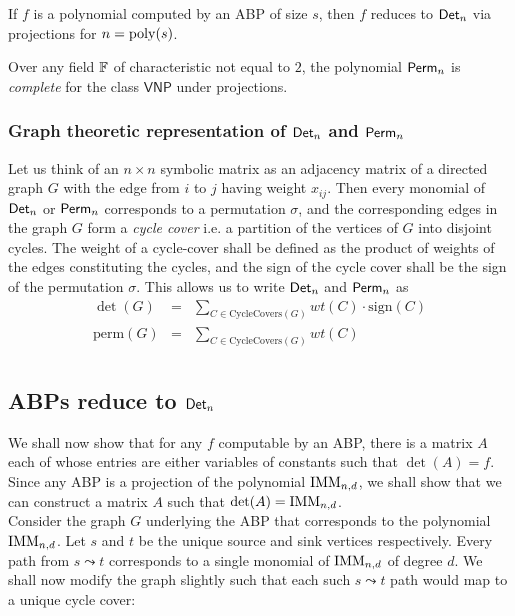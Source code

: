 \begin{theorem}[\cite{v79}]\label{thm:vp}
If $f$ is a polynomial computed by an ABP of size $s$, then $f$ reduces to $\mathsf{Det}_n$ via projections for $n = \mathrm{poly}(s)$. 
\end{theorem}
\begin{theorem}[\cite{v79}]\label{thm:vnp}
Over any field $\mathbb{F}$ of characteristic not equal to $2$, the polynomial $\mathsf{Perm}_n$ is \emph{complete} for the class $\mathsf{VNP}$ under projections.
\end{theorem}

\subsubsection*{Graph theoretic representation of $\mathsf{Det}_n$ and $\mathsf{Perm}_n$}

Let us think of an $n\times n$ symbolic matrix as an adjacency matrix of a directed graph $G$ with the edge from $i$ to $j$ having weight $x_{ij}$. Then every monomial of $\mathsf{Det}_n$ or $\mathsf{Perm}_n$ corresponds to a permutation $\sigma$, and the corresponding edges in the graph $G$ form a \emph{cycle cover} i.e. a partition of the vertices of $G$ into disjoint cycles. The weight of a cycle-cover shall be defined as the product of weights of the edges constituting the cycles, and the sign of the cycle cover shall be the sign of the permutation $\sigma$. This allows us to write $\mathsf{Det}_n$ and $\mathsf{Perm}_n$ as
\begin{eqnarray*}
\det(G) & = & \sum_{C\in \mathrm{CycleCovers}(G)} wt(C) \cdot \mathrm{sign}(C)\\
\mathrm{perm}(G) & = & \sum_{C\in \mathrm{CycleCovers}(G)} wt(C) \\
\end{eqnarray*}

\subsection{ABPs reduce to $\mathsf{Det}_n$}

We shall now show that for any $f$ computable by an ABP, there is a matrix  $A$ each of whose entries are either variables of constants such that $\det(A) = f$. Since any ABP is a projection of the polynomial $\mathrm{IMM}_{n,d}$, we shall show that we can construct a matrix  $A$  such that $\det(A) = \mathrm{IMM}_{n,d}$. \\

Consider the graph $G$ underlying the ABP that corresponds to the polynomial $\mathrm{IMM}_{n,d}$. Let $s$ and $t$ be the unique source and sink vertices respectively. Every path from $s\leadsto t$ corresponds to a single monomial of $\mathrm{IMM}_{n,d}$ of degree $d$. We shall now modify the graph slightly such that each such $s\leadsto t$ path would map to a unique cycle cover:

